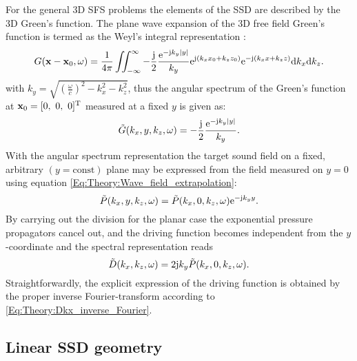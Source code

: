 \vspace{3mm}
For the general 3D SFS problems the elements of the SSD are described by the 3D Green's function. The plane wave expansion of the 3D free field Green's function is termed as the Weyl's integral representation \cite{Williams1999, Lalor1969}:
\begin{equation}
G(\mathbf{x} - \mathbf{x}_0,\omega ) = \frac{1}{4\pi} \iint_{-\infty}^{\infty} -\frac{\mathrm{j}}{2}\frac{\mathrm{e}^{ -\mathrm{j} k_y  | y |  }}{ k_y }
\mathrm{e}^{\mathrm{j} (k_x x_0 + k_z z_0)} \mathrm{e}^{-\mathrm{j} (k_x x + k_z z)} \mathrm{d} k_x \mathrm{d} k_z.
\label{Eq:Theory:Weyls_integra}
\end{equation}
with $k_y = \sqrt{ \left( \frac{\omega}{c} \right )^2 - k_x^2 - k_z^2 }$, thus the angular spectrum of the Green's function at $\mathbf{x}_0 = [0,\ 0,\ 0]^{\mathrm{T}}$ measured at a fixed $y$ is given as:
\begin{equation}
\tilde{G}(k_x,y,k_z,\omega) =-\frac{\mathrm{j}}{2}\frac{\mathrm{e}^{ -\mathrm{j} k_y  | y |  }}{ k_y }.
\end{equation}
With the angular spectrum representation the target sound field on a fixed, arbitrary $(y=\mathrm{const})$ plane may be expressed from the field measured on $y=0$ using equation \eqref{Eq:Theory:Wave_field_extrapolation}:
\begin{equation}
\tilde{P}(k_x,y,k_z,\omega) = \tilde{P}(k_x,0,k_z,\omega) \mathrm{e}^{- \mathrm{j} k_y y}.
\label{Eq:Theory:Wave_field_extrapolation_2}
\end{equation}
By carrying out the division for the planar case the exponential pressure propagators cancel out, and the driving function becomes independent from the $y$-coordinate and the spectral representation reads
\begin{equation}
\tilde{D}(k_x,k_z,\omega) = 2\mathrm{j} k_y \tilde{P}(k_x,0,k_z,\omega).
\label{Eq:Theory:Planar_explicit_driv_fun}
\end{equation}
Straightforwardly, the explicit expression of the driving function is obtained by the proper inverse Fourier-transform according to \eqref{Eq:Theory:Dkx_inverse_Fourier}.

\subsection{Linear SSD geometry}

